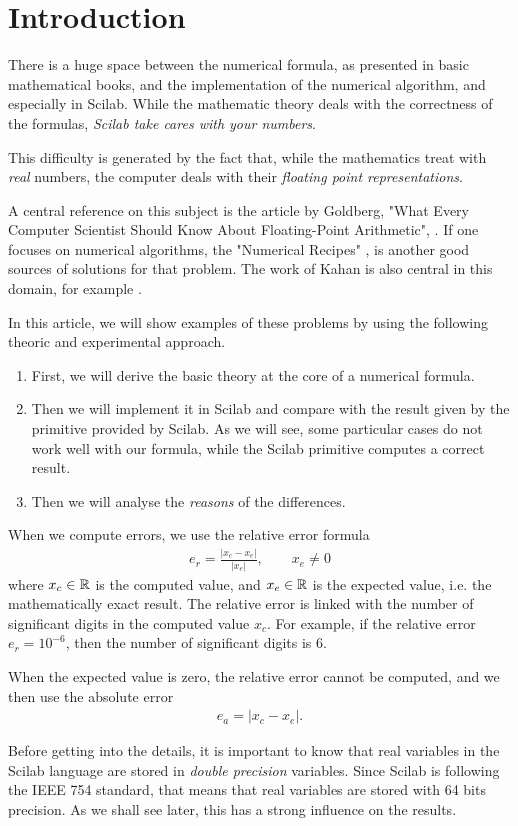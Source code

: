\section{Introduction}

There is a huge space between the numerical formula, as 
presented in basic mathematical books, and the implementation 
of the numerical algorithm, and especially in Scilab.
While the mathematic theory deals with the correctness 
of the formulas, \emph{Scilab take cares with your numbers}.

This difficulty is generated by the fact that, while 
the mathematics treat with \emph{real} numbers, the 
computer deals with their \emph{floating point representations}.

A central reference on this subject is the article 
by Goldberg, "What Every Computer Scientist Should Know About Floating-Point Arithmetic", 
\cite{WhatEveryComputerScientist}.
If one focuses on numerical algorithms, the "Numerical Recipes" \cite{NumericalRecipes},
is another good sources of solutions for that problem.
The work of Kahan is also central in this domain, for example \cite{Kahan2004}.

In this article, we will show examples of these problems by 
using the following theoric and experimental approach.
\begin{enumerate}
\item First, we will derive the basic theory at the core of a numerical
formula. 
\item Then we will implement it in Scilab and compare with the 
result given by the primitive provided by Scilab.
As we will see, some particular cases do not work well
with our formula, while the Scilab primitive computes a correct
result.
\item Then we will analyse the \emph{reasons} of the differences.
\end{enumerate}

When we compute errors, we use the relative error formula
\begin{eqnarray}
e_r=\frac{|x_c-x_e|}{|x_e|}, \qquad x_e\neq 0
\end{eqnarray}
where $x_c\in\mathbb{R}$ is the computed value, and $x_e\in\mathbb{R}$ is the 
expected value, i.e. the mathematically exact result.
The relative error is linked with the number of significant 
digits in the computed value $x_c$. For example, if the relative 
error $e_r=10^{-6}$, then the number of significant digits is 6.

When the expected value is zero, the relative error cannot 
be computed, and we then use the absolute error 
\begin{eqnarray}
e_a=|x_c-x_e|.
\end{eqnarray}

Before getting into the details, it is important to 
know that real variables in the Scilab language are stored in 
\emph{double precision} variables. Since Scilab is 
following the IEEE 754 standard, that means that real 
variables are stored with 64 bits precision.
As we shall see later, this has a strong influence on the 
results.

